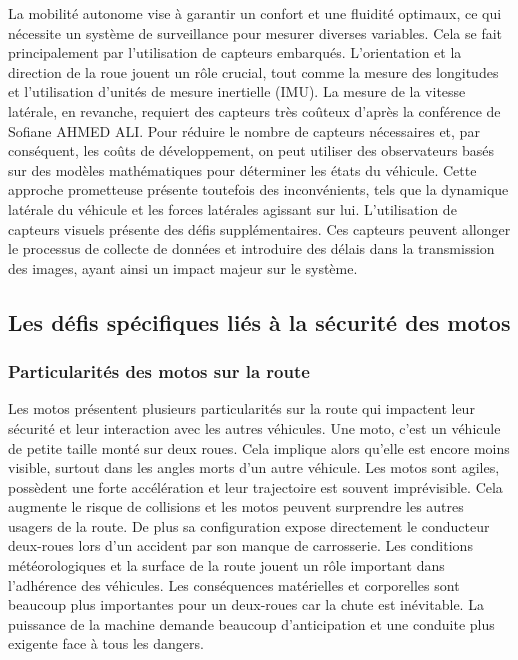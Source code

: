 La mobilité autonome vise à garantir un confort et une fluidité optimaux, ce qui nécessite un système de surveillance pour mesurer diverses variables. Cela se fait principalement par l'utilisation de capteurs embarqués.
L'orientation et la direction de la roue jouent un rôle crucial, tout comme la mesure des longitudes et l'utilisation d'unités de mesure inertielle (IMU). La mesure de la vitesse latérale, en revanche, requiert des capteurs très coûteux d'après la conférence\cite{ahmed_ali_synthese_2024} de Sofiane AHMED ALI.
Pour réduire le nombre de capteurs nécessaires et, par conséquent, les coûts de développement, on peut utiliser des observateurs basés sur des modèles mathématiques pour déterminer les états du véhicule. Cette approche prometteuse présente toutefois des inconvénients, tels que la dynamique latérale du véhicule et les forces latérales agissant sur lui.
L'utilisation de capteurs visuels présente des défis supplémentaires. Ces capteurs peuvent allonger le processus de collecte de données et introduire des délais dans la transmission des images, ayant ainsi un impact majeur sur le système.


\newpage
\subsection{Les défis spécifiques liés à la sécurité des motos}

\subsubsection{Particularités des motos sur la route}
Les motos présentent plusieurs particularités sur la route qui impactent leur sécurité et leur interaction avec les autres véhicules.
Une moto, c'est un véhicule de petite taille monté sur deux roues. Cela implique alors qu'elle est encore moins visible, surtout dans les angles morts d'un autre véhicule. Les motos sont agiles, possèdent une forte accélération et leur trajectoire est souvent imprévisible. Cela augmente le risque de collisions et les motos peuvent surprendre les autres usagers de la route. De plus sa configuration expose directement le conducteur deux-roues lors d'un accident par son manque de carrosserie. Les conditions météorologiques et la surface de la route jouent un rôle important dans l'adhérence des véhicules. Les conséquences matérielles et corporelles sont beaucoup plus importantes pour un deux-roues car la chute est inévitable.
La puissance de la machine demande beaucoup d'anticipation et une conduite plus exigente face à tous les dangers.\\


